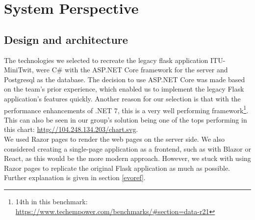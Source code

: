 \newpage
\section{System Perspective}




\subsection{Design and architecture}

The technologies we selected to recreate the legacy flask application ITU-MiniTwit, were C\# with the ASP.NET Core framework for the server and Postgresql as the database. The decision to use ASP.NET Core was made based on the team's prior experience, which enabled us to implement the legacy Flask application's features quickly. Another reason for our selection is that with the performance enhancements of .NET 7, this is a very well performing framework\footnote{14th in this benchmark: 
\url{https://www.techempower.com/benchmarks/#section=data-r21}}. This can also be seen in our group's solution being one of the tops performing in this chart: \url{http://104.248.134.203/chart.svg}. \\

We used Razor pages to render the web pages on the server side. We also considered creating a single-page application as a frontend, such as with Blazor or React, as this would be the more modern approach. However, we stuck with using Razor pages to replicate the original Flask application as much as possible. Further explanation is given in section \ref{evoref}. \\

